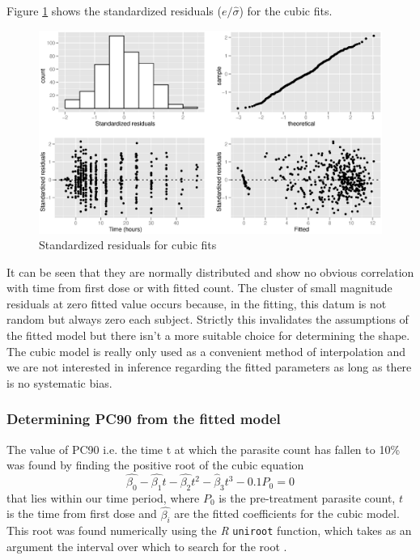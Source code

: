 Figure \ref{cubicsresid} shows the standardized residuals ($e/\hat{\sigma}$) for the cubic fits.
\begin{figure}[h]
\includegraphics[width=150mm]{cubicsresid.eps} 
\caption{Standardized residuals for cubic fits}\label{cubicsresid}
\end{figure}
It can be seen that they are normally distributed and show no obvious correlation with time from first dose or with fitted count. The cluster of small magnitude residuals at zero fitted value occurs because, in the fitting, this datum is not random but always zero each subject. Strictly this invalidates the assumptions of the fitted model but there isn't a more suitable choice for determining the shape. The cubic model is really only used as a convenient method of interpolation and we are not interested in inference regarding the fitted parameters as long as there is no systematic bias. 

\subsubsection*{Determining PC90 from the fitted model}
The value of PC90 i.e. the time t at which the parasite count has fallen to 10\% was found by finding the positive root of the cubic equation
$$\hat{\beta_0}-\hat{\beta_1}t-\hat{\beta_2}t^2-\hat{\beta}_3t^3-0.1{P_{0}}=0$$
that lies within our time period, where $P_0$ is the pre-treatment parasite count, $t$ is the time from first dose and $\hat{\beta_i}$ are the fitted coefficients for the cubic model. This root was found numerically using the \emph{R} \texttt{uniroot} function, which takes as an argument the interval over which to search for the root \cite{R}.

